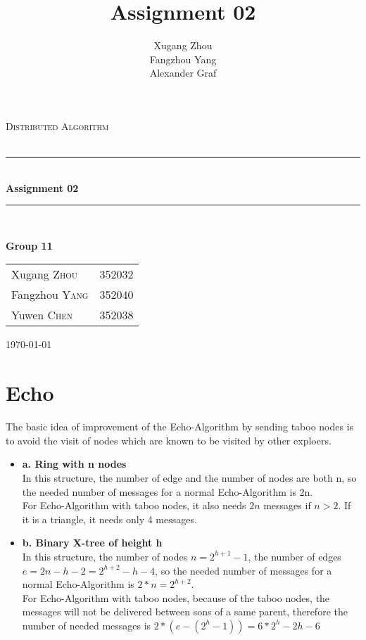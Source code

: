 \documentclass[a4paper, 14pt]{article}
\title{\bf Assignment 02}
\author{Xugang Zhou \\ Fangzhou Yang \\ Alexander Graf}
\newcommand{\HRule}{\rule{\linewidth}{0.5mm}}
\begin{document}
\begin{titlepage}
\begin{center}
\vfill
\textsc{\LARGE Distributed Algorithm}\\[1.5cm]
\textsc{\Large }\\[0.5cm]

\HRule \\[0.4cm]
{\huge \bfseries Assignment 02}\\[0.4cm]
\HRule \\[1.5cm]
\begin{minipage}{0.4\textwidth}
\begin{flushleft} \large
\large{\textbf{Group 11}}
\end{flushleft}
\end{minipage}
\begin{minipage}{0.4\textwidth}
\begin{flushright} \large
\begin{tabular}{ll}
Xugang \textsc{Zhou} & 352032\\
Fangzhou \textsc{Yang} & 352040\\
Yuwen \textsc{Chen} & 352038
\end{tabular}
\end{flushright}
\end{minipage}
\vfill
{\large \today}\\
\end{center}
\end{titlepage}
\thispagestyle{fancy}

\section{Echo}
The basic idea of improvement of the Echo-Algorithm by sending taboo nodes is to avoid the visit of nodes which are known to be visited by other exploers.
\begin {itemize}
\item {\bf a. Ring with n nodes} \\
In this structure, the number of edge and the number of nodes are both n, so the needed number of messages for a normal Echo-Algorithm is 2n. \\
For Echo-Algorithm with taboo nodes, it also needs $2n$ messages if $n>2$. If it is a triangle, it needs only 4 messages.
\item {\bf b. Binary X-tree of height h}\\
In this structure, the number of nodes $n = 2^{h+1} - 1$, the number of edges $e = 2n - h -2 = 2^{h+2} - h -4$, so the needed number of messages for a normal Echo-Algorithm is $2*n = 2^{h+2}$.\\
For Echo-Algorithm with taboo nodes, because of the taboo nodes, the messages will not be delivered between sons of a same parent, therefore the number of needed messages is $2*(e - (2^{h} -1)) = 6 * 2^h - 2h - 6$
\end {itemize}
\end{document}
